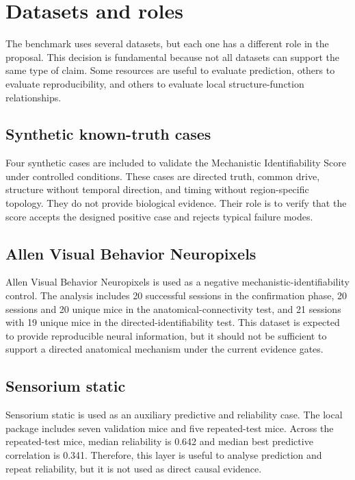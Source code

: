 \section{Datasets and roles}

The benchmark uses several datasets, but each one has a different role in the
proposal. This decision is fundamental because not all datasets can support the
same type of claim. Some resources are useful to evaluate prediction, others to
evaluate reproducibility, and others to evaluate local structure-function
relationships.

\subsection{Synthetic known-truth cases}

Four synthetic cases are included to validate the Mechanistic Identifiability
Score under controlled conditions. These cases are directed truth, common drive,
structure without temporal direction, and timing without region-specific
topology. They do not provide biological evidence. Their role is to verify that
the score accepts the designed positive case and rejects typical failure modes.

\subsection{Allen Visual Behavior Neuropixels}

Allen Visual Behavior Neuropixels is used as a negative
mechanistic-identifiability control. The analysis includes 20 successful
sessions in the confirmation phase, 20 sessions and 20 unique mice in the
anatomical-connectivity test, and 21 sessions with 19 unique mice in the
directed-identifiability test. This dataset is expected to provide reproducible
neural information, but it should not be sufficient to support a directed
anatomical mechanism under the current evidence gates.

\subsection{Sensorium static}

Sensorium static is used as an auxiliary predictive and reliability case. The
local package includes seven validation mice and five repeated-test mice. Across
the repeated-test mice, median reliability is 0.642 and median best predictive
correlation is 0.341. Therefore, this layer is useful to analyse prediction and
repeat reliability, but it is not used as direct causal evidence.

